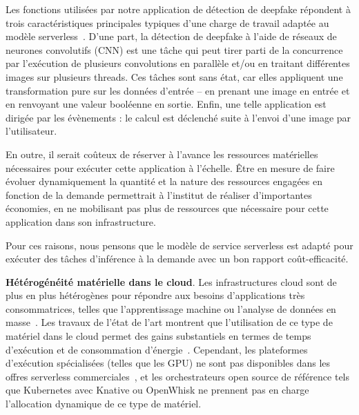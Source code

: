 
Les fonctions utilisées par notre application de détection de deepfake répondent à trois caractéristiques principales typiques d'une charge de travail adaptée au modèle serverless~\cite{cncf2018whitepaper}. D'une part, la détection de deepfake à l'aide de réseaux de neurones convolutifs (CNN) est une tâche qui peut tirer parti de la concurrence par l'exécution de plusieurs convolutions en parallèle et/ou en traitant différentes images sur plusieurs threads. Ces tâches sont sans état, car elles appliquent une transformation pure sur les données d'entrée -- en prenant une image en entrée et en renvoyant une valeur booléenne en sortie. Enfin, une telle application est dirigée par les évènements : le calcul est déclenché suite à l'envoi d'une image par l'utilisateur.

En outre, il serait coûteux de réserver à l'avance les ressources matérielles nécessaires pour exécuter cette application à l'échelle. Être en mesure de faire évoluer dynamiquement la quantité et la nature des ressources engagées en fonction de la demande permettrait à l'institut de réaliser d'importantes économies, en ne mobilisant pas plus de ressources que nécessaire pour cette application dans son infrastructure. %

Pour ces raisons, nous pensons que le modèle de service serverless est adapté pour exécuter des tâches d'inférence à la demande avec un bon rapport coût-efficacité.

\textbf{Hétérogénéité matérielle dans le cloud}. Les infrastructures cloud sont de plus en plus hétérogènes pour répondre aux besoins d'applications très consommatrices, telles que l'apprentissage machine ou l'analyse de données en masse~\cite{reissHeterogeneityDynamicityClouds}. Les travaux de l'état de l'art montrent que l'utilisation de ce type de matériel dans le cloud permet des gains substantiels en termes de temps d'exécution et de consommation d'énergie~\cite{10.1145/3369583.3392679, 9195730}. Cependant, les plateformes d'exécution spécialisées (telles que les GPU) ne sont pas disponibles dans les offres serverless commerciales~\cite{khandelwalTaureauDeconstructingServerless2020}, et les orchestrateurs open source de référence tels que Kubernetes avec Knative ou OpenWhisk ne prennent pas en charge l'allocation dynamique de ce type de matériel.


